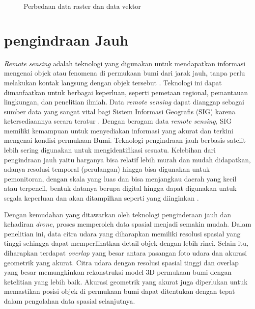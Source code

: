 \begin{figure}[H]
\centering
{}
\caption{Perbedaan data raster dan data vektor
\citep{seputargeografi}}
\label{vektorkon}
\end{figure}

\section{pengindraan Jauh}

\textit{Remote sensing} adalah teknologi yang digunakan untuk mendapatkan informasi mengenai objek atau fenomena di permukaan bumi dari jarak jauh, tanpa perlu melakukan kontak langsung dengan objek tersebut \citep{putri2018analisis}. Teknologi ini dapat dimanfaatkan untuk berbagai keperluan, seperti pemetaan regional, pemantauan lingkungan, dan penelitian ilmiah. Data \textit{remote sensing} dapat dianggap sebagai sumber data yang sangat vital bagi Sistem Informasi Geografis (SIG) karena ketersediaannya secara teratur \citep{ghozali2016pemanfaatan}. Dengan beragam data \textit{remote sensing}, SIG memiliki kemampuan untuk menyediakan informasi yang akurat dan terkini mengenai kondisi permukaan Bumi. Teknologi pengindraan jauh berbasis satelit lebih sering digunakan untuk mengidentifikasi 
sesuatu. Kelebihan dari pengindraan jauh yaitu harganya bisa relatif lebih murah dan 
mudah didapatkan, adanya resolusi temporal (perulangan) hingga bisa digunakan 
untuk pemonitoran, dengan skala yang luas dan bisa menjangkau daerah yang kecil 
atau terpencil, bentuk datanya berupa digital hingga dapat digunakan untuk segala 
keperluan dan akan ditampilkan seperti yang diinginkan \citep{suwargana2010analisis}.

Dengan kemudahan yang ditawarkan oleh teknologi penginderaan jauh dan kehadiran \textit{drone}, proses memperoleh data spasial menjadi semakin mudah. Dalam penelitian ini, data citra udara yang diharapkan memiliki resolusi spasial yang tinggi sehingga dapat memperlihatkan detail objek dengan lebih rinci. Selain itu, diharapkan terdapat \textit{overlap} yang besar antara pasangan foto udara dan akurasi geometrik yang akurat. Citra udara dengan resolusi spasial tinggi dan overlap yang besar memungkinkan rekonstruksi model 3D permukaan bumi dengan ketelitian yang lebih baik. Akurasi geometrik yang akurat juga diperlukan untuk memastikan posisi objek di permukaan bumi dapat ditentukan dengan tepat dalam pengolahan data spasial selanjutnya.



